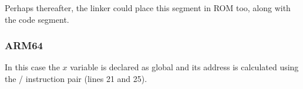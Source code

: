 Perhaps thereafter, the linker could place this segment in ROM too, along with the code segment.

\subsubsection{ARM64}




In this case the $x$ variable is declared as global and its address is calculated using 
the / instruction pair (lines 21 and 25).

